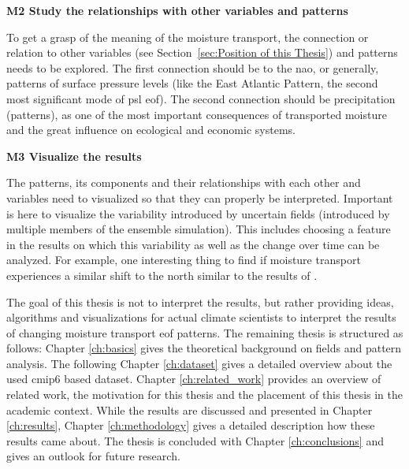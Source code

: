 \textbf{M2 Study the relationships with other variables and patterns}

To get a grasp of the meaning of the moisture transport, the connection or relation to other variables (see Section~\ref{sec:Position of this Thesis}) and patterns needs to be explored. 
The first connection should be to the \ac{nao}, or generally, patterns of surface pressure levels (like the East Atlantic Pattern, the second most significant mode of \ac{psl} \ac{eof}). 
The second connection should be precipitation (patterns), as one of the most important consequences of transported moisture and the great influence on ecological and economic systems. 


\textbf{M3 Visualize the results}

The patterns, its components and their relationships with each other and variables need to visualized so that they can properly be interpreted. 
Important is here  to visualize the variability introduced by uncertain fields (introduced by multiple members of the ensemble simulation).  
This includes choosing a feature in the results on which this variability as well as the change over time can be analyzed. 
For example, one interesting thing to find if moisture transport experiences a similar shift to the north similar to the results of .

The goal of this thesis is not to interpret the results, but rather providing ideas, algorithms and visualizations for actual climate scientists to interpret the results of changing moisture transport \ac{eof} patterns. 
\vspace{.3cm}
The remaining thesis is structured as follows: Chapter \ref{ch:basics} gives the theoretical background on fields and pattern analysis. 
The following Chapter \ref{ch:dataset} gives a detailed overview about the used \ac{cmip}6 based dataset. 
Chapter \ref{ch:related_work} provides an overview of related work, the motivation for this thesis and the placement of this thesis in the academic context. 
While the results are discussed and presented in Chapter \ref{ch:results}, Chapter \ref{ch:methodology} gives a detailed description how these results came about. 
The thesis is concluded with Chapter \ref{ch:conclusions} and gives an outlook for future research. 

